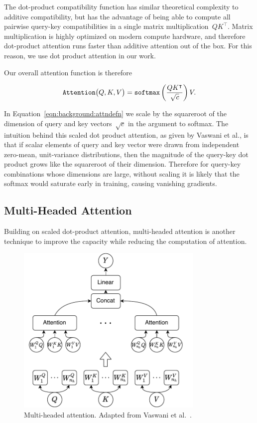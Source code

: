 The dot-product compatibility function has similar theoretical complexity to
additive compatibility, but has the advantage of being able to compute all
pairwise query-key compatibilities in a single matrix
multiplication~$QK^\intercal$.
Matrix multiplication is highly optimized on modern compute hardware, and
therefore dot-product attention runs faster than additive attention out of the
box.
For this reason, we use dot product attention in our work.

Our overall attention function is therefore

\begin{equation}
\mathtt{Attention}\big(Q, K, V\big) = \mathtt{softmax}{}\left(\frac{QK^\intercal}{\sqrt{c}}\right) V.
\label{eqn:background:attndefn}
\end{equation}

In Equation~\ref{eqn:background:attndefn} we scale by the squareroot of the
dimension of query and key vectors~$\sqrt{c}$ in the argument to softmax.
The intuition behind this scaled dot product attention, as given by Vaswani et
al., is that if scalar elements of query and key vector were drawn from
independent zero-mean, unit-variance distributions, then the magnitude of the
query-key dot product grows like the squareroot of their dimension.
Therefore for query-key combinations whose dimensions are large, without
scaling it is likely that the softmax would saturate early in training, causing
vanishing gradients.


\subsection{Multi-Headed Attention}

Building on scaled dot-product attention, multi-headed attention is another
technique to improve the capacity while reducing the computation of attention.

\begin{figure}
\centering
\includegraphics[width=0.8\textwidth]{Figures/multihead-attention.pdf}
\caption{Multi-headed attention. Adapted from Vaswani et
         al.~\cite{vaswani2017attention}.}
\label{fig:background:multiheadattn}
\end{figure}


